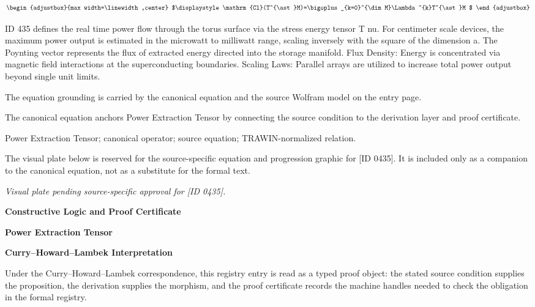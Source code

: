 \[
\begin{adjustbox}{max width=\linewidth,center}
$\displaystyle
\mathrm{Cl}(T^{\ast}M)=\bigoplus_{k=0}^{\dim M}\Lambda^{k}T^{\ast}M
$
\end{adjustbox}
\]

ID 435 defines the real time power flow through the torus surface via the stress energy tensor T nu. For centimeter scale devices, the maximum power output is estimated in the microwatt to milliwatt range, scaling inversely with the square of the dimension a. The Poynting vector represents the flux of extracted energy directed into the storage manifold. Flux Density: Energy is concentrated via magnetic field interactions at the superconducting boundaries. Scaling Laws: Parallel arrays are utilized to increase total power output beyond single unit limits.

The equation grounding is carried by the canonical equation and the source Wolfram model on the entry page.

The canonical equation anchors Power Extraction Tensor by connecting the source condition to the derivation layer and proof certificate.

Power Extraction Tensor; canonical operator; source equation; TRAWIN-normalized relation.
\endgroup

\begingroup\footnotesize\sloppy
The visual plate below is reserved for the source-specific equation and progression graphic for [ID 0435]. It is included only as a companion to the canonical equation, not as a substitute for the formal text.
\par\endgroup
\begingroup\footnotesize\itshape
Visual plate pending source-specific approval for [ID 0435].
\par\endgroup

\clearpage
\begingroup\tzpsupportsetup
\noindent\textbf{\fontsize{10.8pt}{12.8pt}\selectfont [ID 0435] Constructive Logic and Proof Certificate}\par
\noindent\textbf{\fontsize{10pt}{12pt}\selectfont Power Extraction Tensor}\par
\vspace{0.45em}
\begingroup
\footnotesize
\setlength{\parskip}{0.22em}
\setlength{\parindent}{0pt}
\noindent\textbf{Curry--Howard--Lambek Interpretation}\par
Under the Curry--Howard--Lambek correspondence, this registry entry is read as a typed proof
object: the stated source condition supplies the proposition, the derivation supplies the
morphism, and the proof certificate records the machine handles needed to check the obligation
in the formal registry.

